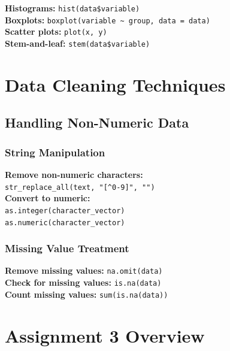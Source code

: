 \documentclass[11pt,a4paper]{article}
\begin{document}
\begin{formulabox}
\textbf{Histograms:} \texttt{hist(data\$variable)}\\
\textbf{Boxplots:} \texttt{boxplot(variable \textasciitilde{} group, data = data)}\\
\textbf{Scatter plots:} \texttt{plot(x, y)}\\
\textbf{Stem-and-leaf:} \texttt{stem(data\$variable)}
\end{formulabox}

\section{Data Cleaning Techniques}

\subsection{Handling Non-Numeric Data}

\subsubsection{String Manipulation}

\begin{formulabox}
\textbf{Remove non-numeric characters:}\\
\texttt{str\_replace\_all(text, "[\textasciicircum{}0-9]", "")}\\[0.3cm]
\textbf{Convert to numeric:}\\
\texttt{as.integer(character\_vector)}\\
\texttt{as.numeric(character\_vector)}
\end{formulabox}

\subsubsection{Missing Value Treatment}

\begin{formulabox}
\textbf{Remove missing values:} \texttt{na.omit(data)}\\
\textbf{Check for missing values:} \texttt{is.na(data)}\\
\textbf{Count missing values:} \texttt{sum(is.na(data))}
\end{formulabox}

\section{Assignment 3 Overview}
\end{document}
